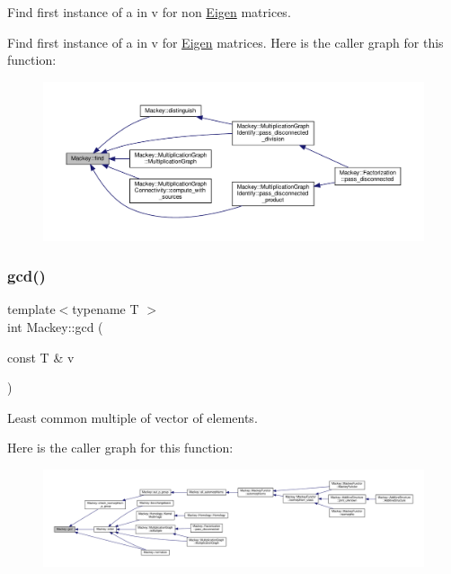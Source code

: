 Find first instance of a in v for non \hyperlink{namespaceEigen}{Eigen} matrices. 

Find first instance of a in v for \hyperlink{namespaceEigen}{Eigen} matrices. Here is the caller graph for this function\+:\nopagebreak
\begin{figure}[H]
\begin{center}
\leavevmode
\includegraphics[width=350pt]{namespaceMackey_a91104eaef1ab349e68f0623cfaaf45c0_icgraph}
\end{center}
\end{figure}
\mbox{\label{namespaceMackey_a9c9c2faea24be988cdfcd773360134be}} 
\subsubsection{\texorpdfstring{gcd()}{gcd()}}
{\footnotesize\ttfamily template$<$typename T $>$ \\
int Mackey\+::gcd (\begin{DoxyParamCaption}\item[{const T \&}]{v }\end{DoxyParamCaption})}



Least common multiple of vector of elements. 

Here is the caller graph for this function\+:\nopagebreak
\begin{figure}[H]
\begin{center}
\leavevmode
\includegraphics[width=350pt]{namespaceMackey_a9c9c2faea24be988cdfcd773360134be_icgraph}
\end{center}
\end{figure}
\mbox{\label{namespaceMackey_a2b9319a9af0a3cad8cfec47e9197dc82}} 
